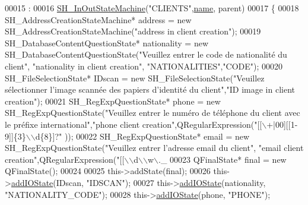 \begin{DoxyCode}
00015                                                                                           :
00016     \hyperlink{classSimpleHotel_1_1SH__InOutStateMachine_af725c1a19c2b13b7f07f3966e632a00b}{SH\_InOutStateMachine}(\textcolor{stringliteral}{"CLIENTS"},\hyperlink{classSimpleHotel_1_1SH__NamedObject_ad144716345034c91cface8f3163a799e}{name}, parent)
00017 \{
00018     SH\_AddressCreationStateMachine* address = \textcolor{keyword}{new} SH\_AddressCreationStateMachine(\textcolor{stringliteral}{"address in client
       creation"});
00019     SH\_DatabaseContentQuestionState* nationality = \textcolor{keyword}{new} SH\_DatabaseContentQuestionState(\textcolor{stringliteral}{"Veuillez entrer le
       code de nationalité du client"}, \textcolor{stringliteral}{"nationality in client creation"}, \textcolor{stringliteral}{"NATIONALITIES"},\textcolor{stringliteral}{"CODE"});
00020     SH\_FileSelectionState* IDscan = \textcolor{keyword}{new} SH\_FileSelectionState(\textcolor{stringliteral}{"Veuillez sélectionner l'image scannée des
       papiers d'identité du client"},\textcolor{stringliteral}{"ID image in client creation"});
00021     SH\_RegExpQuestionState* phone = \textcolor{keyword}{new} SH\_RegExpQuestionState(\textcolor{stringliteral}{"Veuillez entrer le numéro de téléphone du
       client avec le préfixe international"},\textcolor{stringliteral}{"phone client creation"},QRegularExpression(\textcolor{stringliteral}{"[[\(\backslash\)+|00][[1-9]]\{3\}\(\backslash\)\(\backslash\)d\{8\}]?"}
      ));
00022     SH\_RegExpQuestionState* email = \textcolor{keyword}{new} SH\_RegExpQuestionState(\textcolor{stringliteral}{"Veuillez entrer l'adresse email du client"},\textcolor{stringliteral}{
      "email client creation"},QRegularExpression(\textcolor{stringliteral}{"[[\(\backslash\)\(\backslash\)d\(\backslash\)\(\backslash\)w\(\backslash\).\_%
00023     QFinalState* \textcolor{keyword}{final} = \textcolor{keyword}{new} QFinalState();
00024 
00025     this->addState(\textcolor{keyword}{final});
00026     this->\hyperlink{classSimpleHotel_1_1SH__InOutStateMachine_a07ae9f1f74a9a41b26e77a014679a33e}{addIOState}(IDscan, \textcolor{stringliteral}{"IDSCAN"});
00027     this->\hyperlink{classSimpleHotel_1_1SH__InOutStateMachine_a07ae9f1f74a9a41b26e77a014679a33e}{addIOState}(nationality, \textcolor{stringliteral}{"NATIONALITY\_CODE"});
00028     this->\hyperlink{classSimpleHotel_1_1SH__InOutStateMachine_a07ae9f1f74a9a41b26e77a014679a33e}{addIOState}(phone, \textcolor{stringliteral}{"PHONE"});
}
\end{DoxyCode}
